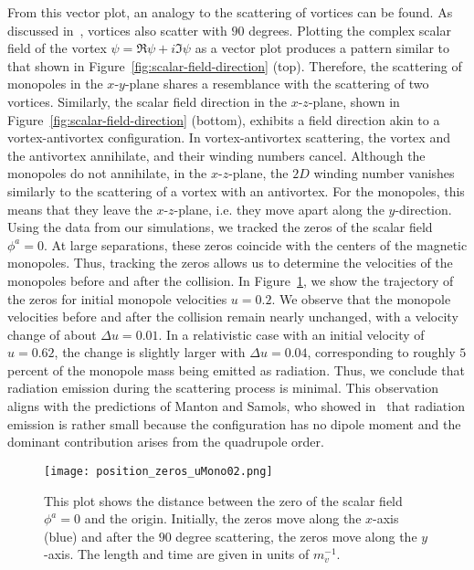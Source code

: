 \documentclass[aps, prd, twocolumn, superscriptaddress, preprintnumbers, nofootinbib, longbibliography]{revtex4-1}
\begin{document}
From this vector plot, an analogy to the scattering of vortices can be found. As discussed in~\cite{Shellard:1988zx,Samols:1991ne}, vortices also scatter with $90$ degrees. Plotting the complex scalar field of the vortex $\psi = \Re{\psi} + i \Im{\psi}$ as a vector plot produces a pattern similar to that shown in Figure~\ref{fig:scalar-field-direction} (top). Therefore, the scattering of monopoles in the $x$-$y$-plane shares a resemblance with the scattering of two vortices.
Similarly, the scalar field direction in the $x$-$z$-plane, shown in Figure~\ref{fig:scalar-field-direction} (bottom), exhibits a field direction akin to a vortex-antivortex configuration. In vortex-antivortex scattering, the vortex and the antivortex annihilate, and their winding numbers cancel. Although the monopoles do not annihilate, in the $x$-$z$-plane, the $2D$ winding number vanishes similarly to the scattering of a vortex with an antivortex. For the monopoles, this means that they leave the $x$-$z$-plane, i.e. they move apart along the $y$-direction.\\

Using the data from our simulations, we tracked the zeros of the scalar field $\phi^a = 0$. At large separations, these zeros coincide with the centers of the magnetic monopoles. Thus, tracking the zeros allows us to determine the velocities of the monopoles before and after the collision. In Figure~\ref{fig:position-zeros}, we show the trajectory of the zeros for initial monopole velocities $u = 0.2$. We observe that the monopole velocities before and after the collision remain nearly unchanged, with a velocity change of about $\Delta u = 0.01$. In a relativistic case with an initial velocity of $u = 0.62$, the change is slightly larger with $\Delta u = 0.04$, corresponding to roughly $5$ percent of the monopole mass being emitted as radiation. Thus, we conclude that radiation emission during the scattering process is minimal. This observation aligns with the predictions of Manton and Samols, who showed in~\cite{Manton:1988bn} that radiation emission is rather small because the configuration has no dipole moment and the dominant contribution arises from the quadrupole order.

\begin{figure}[h]
    \texttt{[image: position\_zeros\_uMono02.png]}
    \caption{This plot shows the distance between the zero of the scalar field $\phi^a=0$ and the origin. Initially, the zeros move along the $x$-axis (blue) and after the $90$ degree scattering, the zeros move along the $y$-axis. The length and time are given in units of $m_v^{-1}$.}
    \label{fig:position-zeros}
\end{figure} 
\end{document}
